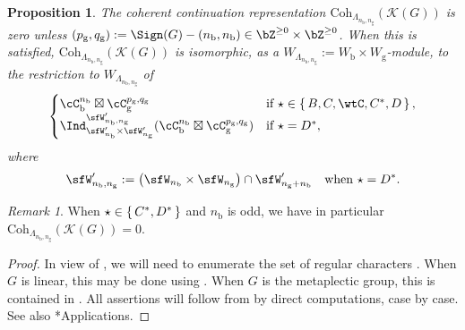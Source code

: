 \documentclass[12pt,a4paper]{amsart}
\newcommand{\CK}{{\mathcal {K}}}
\numberwithin{equation}{section}
\newtheorem{prop}[thm]{Proposition}
\theoremstyle{remark}
\newtheorem{remark}[thm]{Remark}
\def\Coh{\mathrm{Coh}}
\begin{document}
\begin{prop}\label{prop:cohBCD}
  The coherent continuation representation $\Coh_{\Lambda_{n_{\mathrm b},n_{\mathrm g}}}(\CK(G))$ is zero unless $(p_{\mathrm g},q_{\mathrm g}):= \Sign(G) - (n_{\mathrm b},n_{\mathrm b})\in \bZ^{\geq 0}\times \bZ^{\geq 0}$. When this is satisfied, $\Coh_{\Lambda_{n_{\mathrm b},n_{\mathrm g}}}(\CK(G))$ is isomorphic, as a $W_{\Lambda_{n_{\mathrm b},n_{\mathrm g}}}:= W_{\mathrm b}\times W_{\mathrm g}$-module, to the restriction to $W_{\Lambda_{n_{\mathrm b},n_{\mathrm g}}}$ of
  \[
    \begin{cases}
      \cC_{\mathrm b}^{n_{\mathrm b}}\boxtimes\cC_{\mathrm g}^{p_{\mathrm g},q_{\mathrm g}} & \text{if } \star \in \set{B,C,\wtC,C^{*},D},\\
      \Ind_{\sfW'_{n_{\mathrm b}}\times \sfW'_{n_{\mathrm g}}}^{\sfW_{n_{\mathrm b},n_{\mathrm g}}'}(\cC_{\mathrm b}^{n_{\mathrm b}}\boxtimes\cC_{\mathrm g}^{p_{\mathrm g},q_{\mathrm g}}) & \text{if } \star = D^{*}, \\
    \end{cases}
  \]
  where
  \[
    \sfW_{n_{\mathrm b},n_{\mathrm g}}' := \left(\sfW_{n_{\mathrm b}}\times \sfW_{n_{\mathrm g}}\right)\cap \sfW'_{n_{\mathrm g}+n_{\mathrm b}} \quad \text{when $\star = D^{*}$.}
  \]
\end{prop}

\begin{remark}
  When $\star \in \set{C^{*},D^{*}}$ and $n_{\mathrm b}$ is odd, we have in particular $\Coh_{\Lambda_{n_{\mathrm b},n_{\mathrm g}}}(\CK(G))=0$.
\end{remark}

\begin{proof}
  In view of , we will need to enumerate the set of regular characters \cite[Section 2]{V4}. 
  When $G$ is linear, this may be done using \cite{AC}. When $G$ is the metaplectic group, this is contained in \cite{RT1,RT2}. All assertions will follow from  by direct computations, case by case. See also
  \cite{Mc}*{Applications}.
\end{proof}
\end{document}

